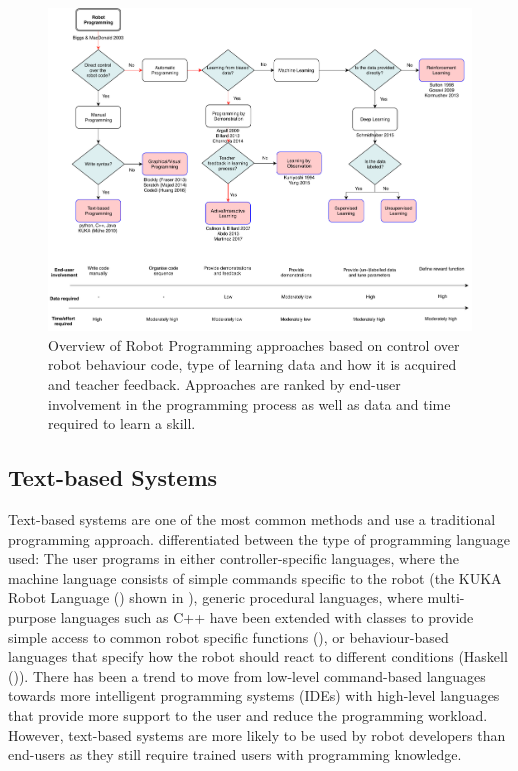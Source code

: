 \clearpage
\begin{figure}
	\centering
	\includegraphics[width=0.95\linewidth]{figures/RobotProgrammingOverview}
	\caption{Overview of Robot Programming approaches based on control over robot behaviour code, type of learning data and how it is acquired and teacher feedback. Approaches are ranked by end-user involvement in the programming process as well as data and time required to learn a skill.}
	\label{fig:RobotProgrammingOverview}
\end{figure}
\clearpage


\subsection{Text-based Systems}\label{sssec:Text-based Systems}
Text-based systems are one of the most common methods and use a traditional programming approach. 
\cite{Biggs2003} differentiated between the type of programming language used:
The user programs in either controller-specific languages, where the machine language consists of simple commands specific to the robot (\eg the KUKA Robot Language (\cite{braumann2011parametric,muhe2010reverse}) shown in ),
generic procedural languages, where multi-purpose languages such as C++ have been extended with classes to provide simple access to common robot specific functions ({\eg \cite{lego2003}}), or behaviour-based languages that specify how the robot should react to different conditions (\eg Haskell (\cite{hudak2002arrows})). 
There has been a trend to move from low-level command-based languages towards more intelligent programming systems (\eg IDEs) with high-level languages that provide more support to the user and reduce the programming workload.
However, text-based systems are more likely to be used by robot developers than end-users as they still require trained users with programming knowledge.

